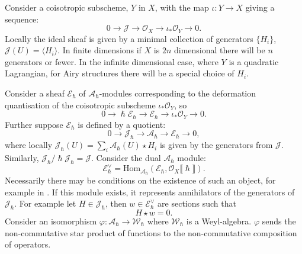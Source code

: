     Consider a coisotropic subscheme, \(Y\) in \(X\), with the map \( \iota : Y \rightarrow X\) giving a sequence:
    \[ 0 \rightarrow \mathcal{J} \rightarrow \mathcal{O}_X \rightarrow \iota_{*}\mathcal{O}_Y \rightarrow 0. \]
    Locally the ideal sheaf is given by a minimal collection of generators \(\{H_i\}\), \( \mathcal{J}(U) = \langle H_i \rangle \). In finite dimensions if \(X\) is \(2n\) dimensional there will be \(n\) generators or fewer. In the infinite dimensional case, where \(Y\) is a quadratic Lagrangian, for Airy structures there will be a special choice of \(H_i\).
    
    Consider a sheaf \( \mathcal{E}_{\hslash}\) of \( \mathcal{A}_{\hslash}\)-modules corresponding to the deformation quantisation of the coisotropic subscheme \( \iota_{*} \mathcal{O}_Y\), so
    \[ 0 \rightarrow \hslash \mathcal{E}_{\hslash} \rightarrow \mathcal{E}_{\hslash} \rightarrow \iota_{*} \mathcal{O}_Y \rightarrow 0.\]
    Further suppose \( \mathcal{E}_{\hslash}\) is defined by a quotient:
    \begin{equation}
        \label{eqn:exactseqJAE}
        0 \rightarrow \mathcal{J}_{\hslash}   \rightarrow \mathcal{A}_\hslash  \rightarrow \mathcal{E}_\hslash \rightarrow 0,
    \end{equation} 
    where locally \( \mathcal{J}_{\hslash}(U) = \sum_i \mathcal{A}_{\hslash }(U) \star  H_i  \) is given by the generators from \( \mathcal{J}\).
    Similarly, \( \mathcal{J}_{\hslash}/\hslash \mathcal{J}_{\hslash} = \mathcal{J} \). Consider the dual \( \mathcal{A}_{\hslash}\) module:
    \[ \mathcal{E}_{\hslash}^{\vee} = \mathrm{Hom}_{\mathcal{A}_{\hslash}}(\mathcal{E}_{\hslash},\mathcal{O}_X \lBrack \hslash \rBrack ).\]
    Necessarily there may be conditions on the existence of such an object, for example in  \cite[section 2.4, page 15]{abpolyquant}. If this module exists, it represents annihilators of the generators of \( \mathcal{J}_{\hslash}\). For example let \(H \in \mathcal{J}_\hslash\), then  \( w \in \mathcal{E}^{\vee}_{\hslash}\) are sections such that 
    \begin{equation}
        \label{eqn:annih}
        H \star w = 0.
    \end{equation}
    Consider an isomorphism  \( \varphi : \mathcal{A}_{\hslash} \rightarrow \mathcal{W}_{\hslash}\) where \( \mathcal{W}_{\hslash}\) is a Weyl-algebra. \( \varphi\) sends the non-commutative star product of functions to the non-commutative composition of operators.
